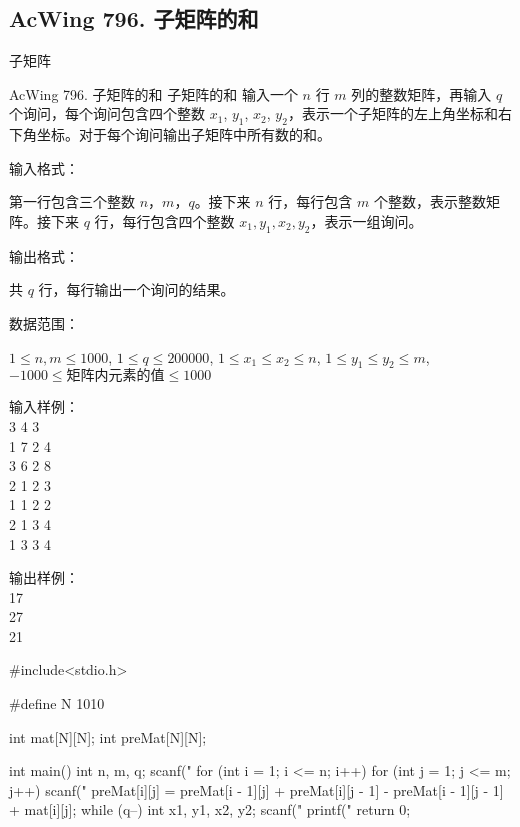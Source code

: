 \subsection{AcWing 796. 子矩阵的和}
子矩阵
\begin{problembox}{AcWing 796. 子矩阵的和}
    \small{子矩阵的和}
    输入一个 $n$ 行 $m$ 列的整数矩阵，再输入 $q$ 个询问，每个询问包含四个整数 $x_1$, $y_1$, $x_2$, $y_2$，表示一个子矩阵的左上角坐标和右下角坐标。对于每个询问输出子矩阵中所有数的和。

    输入格式：

    第一行包含三个整数 $n$，$m$，$q$。接下来 $n$ 行，每行包含 $m$ 个整数，表示整数矩阵。接下来 $q$ 行，每行包含四个整数 $x_1, y_1, x_2, y_2$，表示一组询问。
    
    输出格式：

    共 $q$ 行，每行输出一个询问的结果。
    
    数据范围：

    $1 \le n,m \le 1000$, 
    $1 \le q \le 200000$, 
    $1 \le x_1 \le x_2 \le n$, 
    $1 \le y_1 \le y_2 \le m$, 
    $-1000 \le 矩阵内元素的值 \le 1000$

    \begin{minipage}[t]{.5\textwidth}
        输入样例：\\
        3 4 3 \\
        1 7 2 4 \\
        3 6 2 8 \\
        2 1 2 3 \\
        1 1 2 2 \\
        2 1 3 4\\
        1 3 3 4
        \end{minipage}%
        \begin{minipage}[t]{.5\textwidth}
        输出样例：\\
        17 \\
        27 \\
        21
    \end{minipage}
\end{problembox}

\begin{mycpponecol}[子矩阵的和]
#include<stdio.h>

#define N 1010

int mat[N][N];
int preMat[N][N];

int main()
{
    int n, m, q;
    scanf("%
    for (int i = 1; i <= n; i++) {
        for (int j = 1; j <= m; j++) {
            scanf("%
            preMat[i][j] = preMat[i - 1][j] + preMat[i][j - 1] - preMat[i - 1][j - 1] + mat[i][j];
        }
    }
    while (q--) {
        int x1, y1, x2, y2;
        scanf("%
        printf("%
    }
    return 0;
}
\end{mycpponecol}

